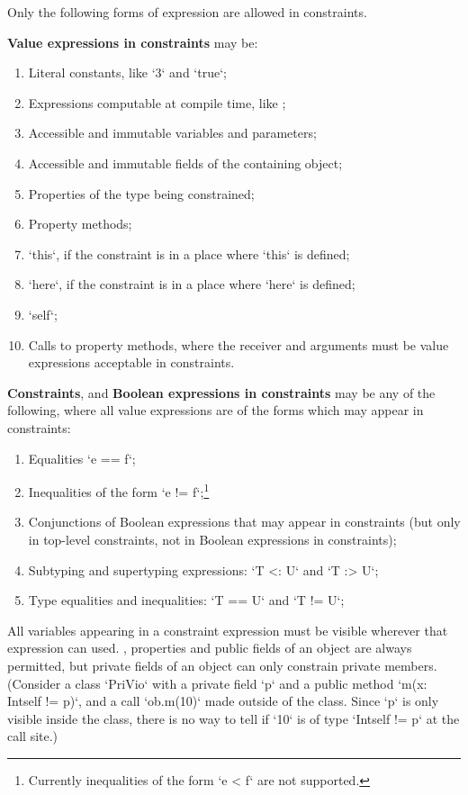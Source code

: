 Only the following forms of expression are allowed in constraints.  

{\bf Value expressions in constraints} may be: 
\begin{enumerate}
\item Literal constants, like \xcd`3` and \xcd`true`;
\item Expressions computable at compile time, like ;
\item Accessible and immutable variables and parameters;
\item Accessible and immutable fields of the containing object;
\item Properties of the type being constrained;
\item Property methods;
\item \xcd`this`, if the constraint is in a place where \xcd`this` is defined;
\item \xcd`here`, if the constraint is in a place where \xcd`here` is defined;
\item \xcd`self`;
\item Calls to property methods, where the receiver and arguments must be
      value expressions acceptable in constraints.
\end{enumerate}


{\bf Constraints}, and {\bf Boolean expressions in constraints}  may be any of
the following, where 
all value expressions are of the forms which may appear in constraints: 
\begin{enumerate}
\item Equalities \xcd`e == f`;
\item Inequalities of the form \xcd`e != f`;\footnote{Currently inequalities
      of the form \xcd`e < f` are not supported.}
\item Conjunctions of Boolean expressions that may appear in constraints (but
      only in top-level constraints, not in Boolean expressions in constraints);
\item Subtyping and supertyping expressions: \xcd`T <: U` and \xcd`T :> U`; 
\item Type equalities and inequalities: \xcd`T == U` and \xcd`T != U`; 
\end{enumerate}

All variables appearing in a constraint expression must be visible wherever
that expression can used.  \Eg, properties and public fields of an object are
always permitted, but private fields of an object can only constrain private
members.  (Consider a class \xcd`PriVio` with a private field \xcd`p` and a
public method \xcd`m(x: Int{self != p})`, and a call \xcd`ob.m(10)` made
outside of the class. Since \xcd`p` is only visible inside the class, there is
no way to tell if \xcd`10` is of type \xcd`Int{self != p}` at the call site.)

